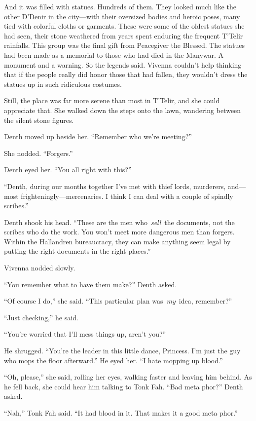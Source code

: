 And it was filled with statues. Hundreds of them. They looked much like the other D’Denir in the city—with their oversized bodies and heroic poses, many tied with colorful cloths or garments. These were some of the oldest statues she had seen, their stone weathered from years spent enduring the frequent T’Telir rainfalls. This group was the final gift from Peacegiver the Blessed. The statues had been made as a memorial to those who had died in the Manywar. A monument and a warning. So the legends said. Vivenna couldn’t help thinking that if the people really did honor those that had fallen, they wouldn’t dress the statues up in such ridiculous costumes.

Still, the place was far more serene than most in T’Telir, and she could appreciate that. She walked down the steps onto the lawn, wandering between the silent stone figures.

Denth moved up beside her. “Remember who we’re meeting?”

She nodded. “Forgers.”

Denth eyed her. “You all right with this?”

“Denth, during our months together I’ve met with thief lords, murderers, and—most frighteningly—mercenaries. I think I can deal with a couple of spindly scribes.”

Denth shook his head. “These are the men who~\textit{sell}~the documents, not the scribes who do the work. You won’t meet more dangerous men than forgers. Within the Hallandren bureaucracy, they can make anything seem legal by putting the right documents in the right places.”

Vivenna nodded slowly.

“You remember what to have them make?” Denth asked.

“Of course I do,” she said. “This particular plan was~\textit{my}~idea, remember?”

“Just checking,” he said.

“You’re worried that I’ll mess things up, aren’t you?”

He shrugged. “You’re the leader in this little dance, Princess. I’m just the guy who mops the floor afterward.” He eyed her. “I hate mopping up blood.”

“Oh, please,” she said, rolling her eyes, walking faster and leaving him behind. As he fell back, she could hear him talking to Tonk Fah. “Bad meta phor?” Denth asked.

“Nah,” Tonk Fah said. “It had blood in it. That makes it a good meta phor.”

